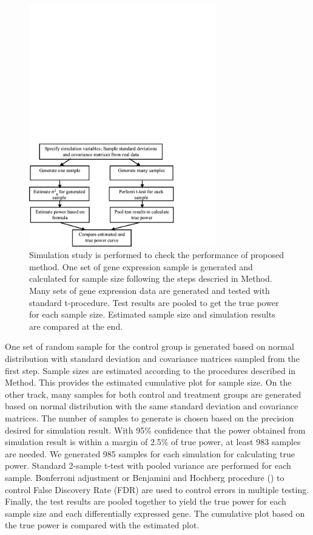 \documentclass{bioinfo}
\begin{document}
\begin{figure}[h]
  \centerline{\includegraphics*[width=3.2in]{SimuFC.pdf}}
  \caption[Flow Chart for Simulation Study]
  {Simulation study is performed to check the performance of proposed method.
    One set of gene expression sample is generated and calculated for sample size following the steps descried in Method. Many sets of gene expression data are generated and
    tested with standard t-procedure. Test results are pooled to get the true power for
    each sample size. Estimated sample size and simulation results are compared at the end.}
  \label{fig:SimuFC}
\end{figure}

One set of random sample for the control group is generated based
on normal distribution with standard deviation and covariance
matrices sampled from the first step. Sample sizes are estimated
according to the procedures described in Method. This provides the
estimated cumulative plot for sample size. On the other track,
many samples for both control and treatment groups are generated
based on normal distribution with the same standard deviation and
covariance matrices. The number of samples to generate is chosen
based on the precision desired for simulation result. With 95\%
confidence that the power obtained from simulation result is
within a margin of 2.5\% of true power, at least 983 samples are
needed. We generated 985 samples for each simulation for
calculating true power. Standard 2-sample t-test with pooled
variance are performed for each sample. Bonferroni adjustment or
Benjamini and Hochberg procedure (\citealp{Benjamini95}) to
control False Discovery Rate (FDR) are used to control errors in
multiple testing. Finally, the test results are pooled together to
yield the true power for each sample size and each differentially
expressed gene. The cumulative plot based on the true power is
compared with the estimated plot.
\end{document}
